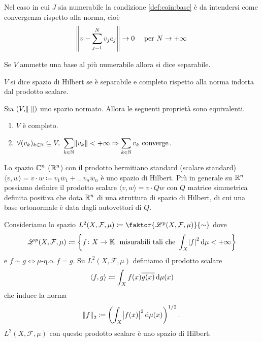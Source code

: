 Nel caso in cui $ J $ sia numerabile la condizione \ref{def:coin:base} è da intendersi come convergenza rispetto alla norma, cioè
\[
    \norm{v - \sum_{j = 1}^{N} v_j e_j} \to 0 \quad \text{ per } N \to +\infty
\]

\begin{definition}
   Se $ V $ ammette una base al più numerabile allora si dice separabile.
\end{definition}

\begin{definition}
    $ V $ si dice spazio di Hilbert se è separabile e completo rispetto alla norma indotta dal prodotto scalare.
\end{definition}

\begin{thm}
    Sia $ (V, \norm{\;}) $ uno spazio normato. Allora le seguenti proprietà sono equivalenti.
    \begin{enumerate}[label=(\roman*)]
        \item $ V $ è completo.
        \item $ \forall (v_k)_{k \in \mathbb{N}} \subseteq V, \ \displaystyle{\sum_{k \in \mathbb{N}} \norm{v_k} < +\infty \Rightarrow \sum_{k \in \mathbb{N}} v_k} \text{ converge} $. 
    \end{enumerate}
\end{thm}

\begin{example}[$ \R^n, \C^n $]
    Lo spazio $ \mathbb{C}^n $ ($ \mathbb{R}^n $) con il prodotto hermitiano standard (scalare standard) $ {\langle v, w \rangle} = v \cdot w \coloneqq v_1\bar{w}_1 + \ldots v_n\bar{w}_n $ è uno spazio di Hilbert. Più in generale su $ \mathbb{R}^n $ possiamo definire il prodotto scalare $ {\langle v, w \rangle} = v \cdot Qw $ con $ Q $ matrice simmetrica definita positiva che dota $ \mathbb{R}^n $ di una struttura di spazio di Hilbert, di cui una base ortonormale è data dagli autovettori di $ Q $.  
\end{example}

\begin{example}[spazio $ L^2 $]
    Consideriamo lo spazio $ L^2(X, \mathcal{F}, \mu) \coloneqq \faktor{\mathscr{L}^p(X,\mathcal{F},\mu)}{\sim} $ dove 
    \[
        \mathscr{L}^p(X,\mathcal{F},\mu) \coloneqq \left\{f \colon X \to \K \ \text{ misurabili tali che } \int_{X} \abs{f}^2 \dif{\mu} < +\infty\right\}
    \]
    e $ f \sim g \iff \mu\text{-q.o.} \ f = g $. Su $ L^2(X, \mathcal{F}, \mu) $ definiamo il prodotto scalare 
    \[
        {\langle f, g \rangle} \coloneqq \int_{X} f(x) \overline{g(x)} \dif{\mu(x)}
    \]
    che induce la norma
    \[
        \norm{f}_2 \coloneqq \left(\int_{X} \abs{f(x)}^2 \dif{\mu(x)}\right)^{1/2}.
    \]
    $ L^2(X, \mathcal{F}, \mu) $ con questo prodotto scalare è uno spazio di Hilbert. 
\end{example}

